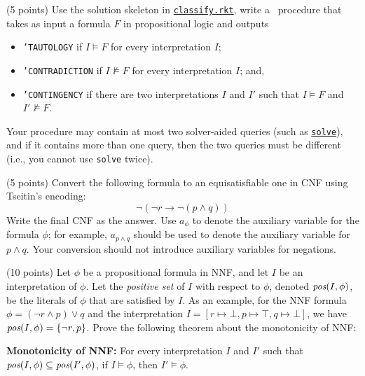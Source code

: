 \documentclass{handout}
\begin{document}
\begin{questions}

\item (5 points) \label{prob:classify} Use the solution skeleton in \href{\gitlab/tree/master/hw1/logic/classify.rkt}{\texttt{classify.rkt}}, 
write a \rosette\ procedure that takes as input a formula $F$ in propositional logic and outputs
\begin{itemize}
\item \texttt{'TAUTOLOGY} if $I \models F$ for every interpretation $I$;
\item \texttt{'CONTRADICTION} if $I \not\models F$ for every interpretation $I$; and, 
\item \texttt{'CONTINGENCY} if there are two interpretations $I$ and $I'$ such that $I\models F$ and $I'\not\models F$.
\end{itemize}
Your procedure may contain at most two solver-aided queries (such as \href{https://docs.racket-lang.org/rosette-guide/ch_syntactic-forms_rosette.html#%28form._%28%28lib._rosette%2Fquery%2Fform..rkt%29._solve%29%29}{\texttt{solve}}), 
and if it contains more than one query, then the two queries must be different (i.e., you cannot use \texttt{solve} twice).



\item (5 points)  Convert the following formula to an equisatisfiable one in CNF using Tseitin's encoding: 
\[\neg ( \neg r \rightarrow \neg (p \land q))\]
Write the final CNF as the answer.  
Use $a_\phi$ to denote the auxiliary variable for the formula $\phi$;
for example, $a_{p\wedge q}$ should be used to denote the auxiliary variable for $p\wedge q$.
Your conversion should not introduce auxiliary variables for negations.



\item (10 points)  Let $\phi$ be a propositional formula in NNF, and let $I$ be an interpretation of $\phi$. Let the \emph{positive set} of $I$ with respect to $\phi$, denoted $\emph{pos}(I, \phi)$, be the literals of $\phi$ that are satisfied by $I$. As an example, for the NNF formula $\phi = (\neg r \land p) \lor q$ and the interpretation $I = [r \mapsto \bot, p \mapsto \top, q \mapsto \bot]$, we have $\emph{pos}(I, \phi) = \{ \neg r, p \}$. Prove the following theorem about the monotonicity of NNF: 

{\bf Monotonicity of NNF:} For every interpretation $I$ and $I'$ such that $\emph{pos}(I, \phi) \subseteq \emph{pos}(I', \phi)$, if $I \models \phi$, then $I' \models \phi$. 


\end{questions}
\end{document}
